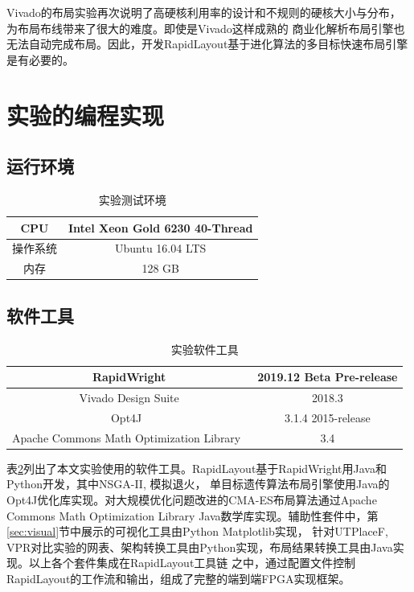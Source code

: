 Vivado的布局实验再次说明了高硬核利用率的设计和不规则的硬核大小与分布，为布局布线带来了很大的难度。即使是Vivado这样成熟的
商业化解析布局引擎也无法自动完成布局。因此，开发RapidLayout基于进化算法的多目标快速布局引擎是有必要的。




\section{实验的编程实现}


\subsection{运行环境}
\begin{table}[h]
	\centering
	\caption{实验测试环境}		
	\label{tab1}
	\begin{tabular}{c|c}
		\toprule[2pt]
        CPU & Intel Xeon Gold 6230 40-Thread\\
        \hline
		操作系统 & Ubuntu 16.04 LTS \\
		\hline                                        
		内存 	& 128 GB	\\
		\bottomrule[2pt]
	\end{tabular}
\end{table}

\subsection{软件工具}

\begin{table}[h]
	\centering
	\caption{实验软件工具}		
	\label{tab2}
	\begin{tabular}{c|c}
		\toprule[2pt]
		RapidWright 	& 2019.12 Beta Pre-release	\\
        \hline                                         
        Vivado Design Suite	&  2018.3 \\
        \hline
        Opt4J~\cite{opt4jpaper}  &  3.1.4 2015-release \\
        \hline
        Apache Commons Math Optimization Library~\cite{math2013commons} & 3.4 \\
        \bottomrule[2pt]
	\end{tabular}
\end{table}

表\ref{tab2}列出了本文实验使用的软件工具。RapidLayout基于RapidWright用Java和Python开发，其中NSGA-II, 模拟退火，
单目标遗传算法布局引擎使用Java的Opt4J优化库实现。对大规模优化问题改进的CMA-ES布局算法通过Apache Commons 
Math Optimization Library Java数学库实现。辅助性套件中，第\ref{sec:visual}节中展示的可视化工具由Python Matplotlib实现，
针对UTPlaceF, VPR对比实验的网表、架构转换工具由Python实现，布局结果转换工具由Java实现。以上各个套件集成在RapidLayout工具链
之中，通过配置文件控制RapidLayout的工作流和输出，组成了完整的端到端FPGA实现框架。


